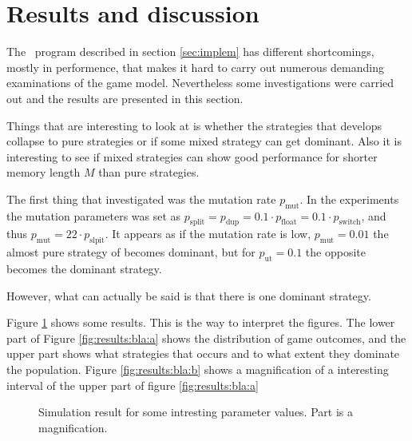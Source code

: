 \section{Results and discussion}\label{sec:results}
The \matlab\ program described in section \ref{sec:implem} has different shortcomings, mostly in performence, that makes it hard to carry out numerous demanding examinations of the game model. Nevertheless some investigations were carried out and the results are presented in this section.\mypar

Things that are interesting to look at is whether the strategies that develops collapse to pure strategies or if some mixed strategy can get dominant. Also it is interesting to see if mixed strategies can show good performance for shorter memory length $M$ than pure strategies.\mypar

The first thing that investigated was the mutation rate $p_{\textrm{mut}}$. In the experiments the mutation parameters was set as $p_{\textrm{split}} = p_{\textrm{dup}} = 0.1\cdot p_{\textrm{float}} = 0.1\cdot p_{\textrm{switch}}$, and thus $p_{\textrm{mut}} = 22 \cdot p_{\textrm{slpit}}$. It appears as if the mutation rate is low, $p_{\textrm{mut}}=0.01$ the almost pure strategy of  becomes dominant, but for $p_{\textrm{ut}}=0.1$ the opposite  becomes the dominant strategy.\mypar

However, what can actually be said is that there is one dominant strategy.\mypar

Figure \ref{fig:results:bla} shows some results. This is the way to interpret the figures. The lower part of Figure \ref{fig:results:bla:a} shows the distribution of game outcomes, and the upper part shows what strategies that occurs and to what extent they dominate the population. Figure \ref{fig:results:bla:b} shows a magnification of a interesting interval of the upper part of figure \ref{fig:results:bla:a}

\begin{figure}[!htbp]\centering


\subfigure[Magnification]{
\label{fig:results:bla:b}
}
\caption{Simulation result for some intresting parameter values. Part  is a magnification.}
\label{fig:results:bla}
\end{figure}


